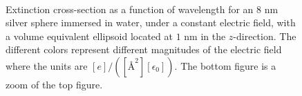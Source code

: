 \begin{figure}%
    \centering
    \\
    \caption{Extinction cross-section as a function of wavelength for an $8$ nm
    silver sphere immersed in water, under a constant electric field, with a volume equivalent ellipsoid
    located at $1$ nm in the $z$-direction. The different colors represent different magnitudes of the 
    electric field where the units are $[e]/([{\text{\AA}}^2][\epsilon_0])$. The bottom figure is a zoom of the top 
    figure.}
    \label{fig:efield effect}
 \end{figure}

